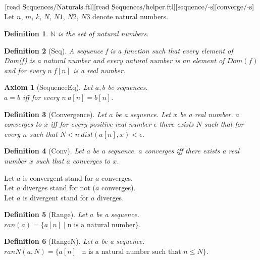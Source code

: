 \documentclass{article}
\newenvironment{forthel}{\begin{leftbar}}{\end{leftbar}}
\newtheorem{axiom}{Axiom}
\newtheorem{definition}{Definition}
\newcommand{\NN}{\mathbb{N}}
\begin{document}
\begin{forthel}
	\noindent $\text{[read Sequences/Naturals.ftl]}\\
	\text{[read Sequences/helper.ftl]}\\
	\text{[sequence/-s]}
	\text{[converge/-s]}$\\
	Let $n$, $m$, $k$, $N$, $N1$, $N2$, $N3$ denote natural numbers.

	\begin{definition}
		$\NN$ is the set of natural numbers.
	\end{definition}
	
	\begin{definition}[Seq]	A sequence f is a function such that every element of Dom(f) is a natural number and every
	natural number is an element of $Dom(f)$ and for every $n \ f[n]$ is a real number.
	\end{definition}
	
	\begin{axiom}[SequenceEq] Let $a, b$ be sequences. \\ $a = b$ iff for every $n \ a[n] = b[n]$.
	\end{axiom}
	
	\begin{definition}[Convergence] Let $a$ be a sequence. Let $x$ be a real number. $a$ converges to $x$ iff for every positive real
	number $\epsilon$ there exists $N$ such that for every $n$ such that $N < n \ dist(a[n],x) < \epsilon$.
	\end{definition}
	
	\begin{definition}[Conv] Let $a$ be a sequence. $a$ converges iff there exists a real number $x$ such that $a$ converges to $x$.
	\end{definition}
	
	\noindent Let $a$ is convergent stand for $a$ converges.
	\\Let $a$ diverges stand for not ($a$ converges).
	\\Let $a$ is divergent stand for $a$ diverges.
	
	\begin{definition}[Range] Let $a$ be a sequence. \\ $ran(a) = \{a[n] \mid \text{n is a natural number} \}$. 
	\end{definition}

	\begin{definition}[RangeN] Let $a$ be a sequence. \\ $ranN(a,N) = \{a[n] \mid \text{n is a natural number such that } n \leq N\}$. 
	\end{definition}
	

\end{forthel}
\end{document}
